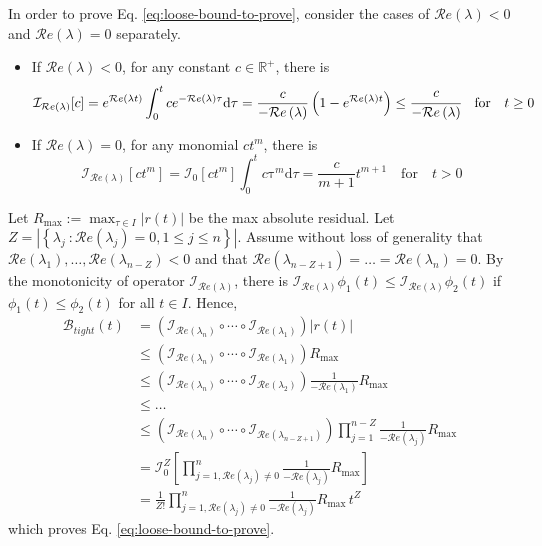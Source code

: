 \documentclass[accepted]{uai2023}
\newcommand{\Bound}{\mathcal{B}}
\newcommand{\I}{\mathcal{I}}
\renewcommand{\Re}[1]{\mathcal{R}e\left(#1\right)}
\begin{document}
In order to prove Eq. \ref{eq:loose-bound-to-prove}, consider the cases of $\Re{\lambda} < 0$ and $\Re{\lambda} = 0$ separately.
\begin{itemize}
    \item If $\Re{\lambda} < 0$, for any constant $c\in \mathbb{R^{+}}$, there is \begin{equation} \I_{\Re{\lambda}} [c] = e^{\Re{\lambda t}} \int_{0}^{t} c e^{-\Re{\lambda}\tau} \mathrm{d}\tau = \frac{c}{-\Re{\lambda}} \left(1 - e^{\Re{\lambda} t}\right) \leq \cfrac{c}{-\Re{\lambda}}\quad \text{for} \quad t\geq0\end{equation}
    \item If $\Re{\lambda} = 0$, for any monomial $c t^{m}$, there is \begin{equation} \I_{\Re{\lambda }}[ct^m] = \I_{0}[ct^m] \int_{0}^{t} c\mathrm{\tau} ^m \mathrm{d}\tau = \frac{c}{m+1}t^{m+1} \quad\text{for}\quad t > 0 \end{equation}
\end{itemize}

Let $\displaystyle R_{\max} := \max_{\tau\in I} |r(t)|$ be the max absolute residual.
Let $Z = |\left\{\lambda_j\ :\Re{\lambda_j} =0,1 \leq j \leq n\right\}|$. 
Assume without loss of generality that $\Re{\lambda_1}, \dots, \Re{\lambda_{n-Z}} < 0$ and that $\Re{\lambda_{n-Z+1}} = \dots = \Re{\lambda_n} = 0$.
By the monotonicity of operator $\I_{\Re{\lambda}}$, there is $\I_{\Re{\lambda}} \phi_1(t) \leq \I_{\Re{\lambda}} \phi_2(t)$ if $\phi_1(t) \leq \phi_2(t)$ for all $t \in I$. Hence, 
\begin{align}
    \Bound_{tight}(t) &= \left(\I_{\Re{\lambda_n}}\circ \cdots \circ\I_{\Re{\lambda_{1}}}\right)\left|r(t)\right| \\
    &\leq \left(\I_{\Re{\lambda_n}}\circ \cdots \circ\I_{\Re{\lambda_{1}}}\right) R_{\max}\\
    &\leq \left(\I_{\Re{\lambda_n}}\circ \cdots \circ\I_{\Re{\lambda_{2}}}\right) \frac{1}{-\Re{\lambda_1}}R_{\max}\\
    &\leq \dots \nonumber \\
    &\leq \left(\I_{\Re{\lambda_n}}\circ \cdots \circ\I_{\Re{\lambda_{n-Z+1}}}\right) \prod_{j=1}^{n-Z}\frac{1}{-\Re{\lambda_j}}R_{\max}\\
    &= \I_0^Z \left[\prod_{j=1, \Re{\lambda_j}\neq 0}^{n}\frac{1}{-\Re{\lambda_j}}R_{\max}\right]\\
    &= \frac{1}{Z!} \prod_{j=1, \Re{\lambda_j}\neq 0}^{n}\frac{1}{-\Re{\lambda_j}}R_{\max}\, t^Z
\end{align}
which proves Eq. \ref{eq:loose-bound-to-prove}.
\end{document}
